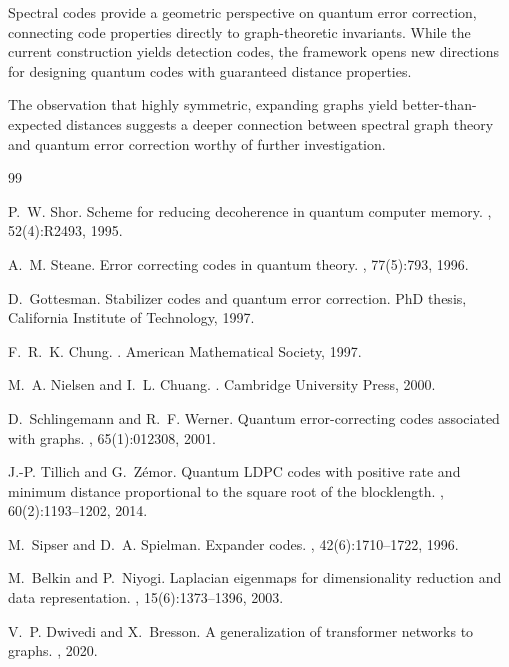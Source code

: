 \documentclass[11pt,a4paper]{article}
\theoremstyle{definition}
\begin{document}
Spectral codes provide a geometric perspective on quantum error correction, connecting code properties directly to graph-theoretic invariants. While the current construction yields detection codes, the framework opens new directions for designing quantum codes with guaranteed distance properties.

The observation that highly symmetric, expanding graphs yield better-than-expected distances suggests a deeper connection between spectral graph theory and quantum error correction worthy of further investigation.


\begin{thebibliography}{99}

P.~W. Shor.
\newblock Scheme for reducing decoherence in quantum computer memory.
, 52(4):R2493, 1995.

A.~M. Steane.
\newblock Error correcting codes in quantum theory.
, 77(5):793, 1996.

D.~Gottesman.
\newblock Stabilizer codes and quantum error correction.
\newblock PhD thesis, California Institute of Technology, 1997.

F.~R.~K. Chung.
.
\newblock American Mathematical Society, 1997.

M.~A. Nielsen and I.~L. Chuang.
.
\newblock Cambridge University Press, 2000.

D.~Schlingemann and R.~F. Werner.
\newblock Quantum error-correcting codes associated with graphs.
, 65(1):012308, 2001.

J.-P. Tillich and G.~Z\'{e}mor.
\newblock Quantum LDPC codes with positive rate and minimum distance proportional to the square root of the blocklength.
, 60(2):1193--1202, 2014.

M.~Sipser and D.~A. Spielman.
\newblock Expander codes.
, 42(6):1710--1722, 1996.

M.~Belkin and P.~Niyogi.
\newblock Laplacian eigenmaps for dimensionality reduction and data representation.
, 15(6):1373--1396, 2003.

V.~P. Dwivedi and X.~Bresson.
\newblock A generalization of transformer networks to graphs.
, 2020.

\end{thebibliography}
\end{document}
